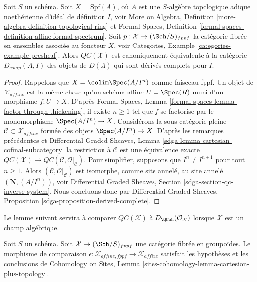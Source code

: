 \begin{proposition}
\label{proposition-QC-derived-complete}
Soit $S$ un schéma. Soit $X = \text{Spf}(A)$, où $A$ est une
$S$-algèbre topologique adique noethérienne d'idéal de définition $I$, voir
More on Algebra, Definition \ref{more-algebra-definition-topological-ring}
et Formal Spaces, Definition
\ref{formal-spaces-definition-affine-formal-spectrum}.
Soit $p : \mathcal{X} \to (\Sch/S)_{fppf}$
la catégorie fibrée en ensembles associée au foncteur $X$, voir
Categories, Example \ref{categories-example-presheaf}.
Alors $\mathit{QC}(\mathcal{X})$ est canoniquement équivalente à la
catégorie $D_{comp}(A, I)$ des objets de $D(A)$ qui sont
dérivés complets pour $I$.
\end{proposition}

\begin{proof}
Rappelons que $X = \colim \Spec(A/I^n)$ comme faisceau fppf.
Un objet de $\mathcal{X}_{affine}$ est la même chose
qu'un schéma affine $U = \Spec(R)$ muni d'un morphisme $f : U \to X$.
D'après Formal Spaces, Lemma \ref{formal-spaces-lemma-factor-through-thickening},
il existe $n \geq 1$ tel que
$f$ se factorise par le monomorphisme $\Spec(A/I^n) \to X$.
Considérons la sous-catégorie pleine
$\mathcal{C} \subset \mathcal{X}_{affine}$ formée des
objets $\Spec(A/I^n) \to X$.
D'après les remarques précédentes et Differential Graded Sheaves, Lemma
\ref{sdga-lemma-cartesian-cofinal-subcategory}
la restriction à $\mathcal{C}$ est une équivalence exacte
$\mathit{QC}(\mathcal{X}) \to
\mathit{QC}(\mathcal{C}, \mathcal{O}|_\mathcal{C})$.
Pour simplifier, supposons que
$I^n \not = I^{n + 1}$ pour tout $n \geq 1$.
Alors $(\mathcal{C}, \mathcal{O}|_\mathcal{C})$ est isomorphe,
comme site annelé, au site annelé $(\mathbf{N}, (A/I^n))$, voir
Differential Graded Sheaves, Section
\ref{sdga-section-qc-inverse-system}.
Nous concluons donc par Differential Graded Sheaves, Proposition
\ref{sdga-proposition-derived-complete}.
\end{proof}

\noindent
Le lemme suivant servira à comparer $\mathit{QC}(\mathcal{X})$
à $D_\QCoh(\mathcal{O}_\mathcal{X})$ lorsque $\mathcal{X}$ est un champ algébrique.

\begin{lemma}
\label{lemma-QC-compare-fppf}
Soit $S$ un schéma. Soit $\mathcal{X} \to (\Sch/S)_{fppf}$ une catégorie
fibrée en groupoïdes. Le morphisme de comparaison
$\epsilon : \mathcal{X}_{affine, fppf} \to \mathcal{X}_{affine}$
satisfait les hypothèses et les conclusions de Cohomology on Sites, Lemma
\ref{sites-cohomology-lemma-cartesion-plus-topology}.
\end{lemma}

